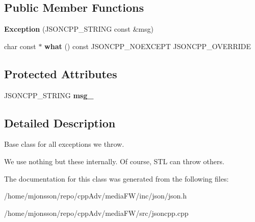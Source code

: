 \subsection*{Public Member Functions}
\begin{DoxyCompactItemize}
\item 
\mbox{\label{classJson_1_1Exception_ae764aa42e0755bd4ce9d303e2733fa8f}} 
{\bfseries Exception} (J\+S\+O\+N\+C\+P\+P\+\_\+\+S\+T\+R\+I\+NG const \&msg)
\item 
\mbox{\label{classJson_1_1Exception_a70b7ce35e761fb93e8cd338e04619cd6}} 
char const  $\ast$ {\bfseries what} () const J\+S\+O\+N\+C\+P\+P\+\_\+\+N\+O\+E\+X\+C\+E\+PT J\+S\+O\+N\+C\+P\+P\+\_\+\+O\+V\+E\+R\+R\+I\+DE
\end{DoxyCompactItemize}
\subsection*{Protected Attributes}
\begin{DoxyCompactItemize}
\item 
\mbox{\label{classJson_1_1Exception_aae3cbb8b45bf21480f64502a8329659f}} 
J\+S\+O\+N\+C\+P\+P\+\_\+\+S\+T\+R\+I\+NG {\bfseries msg\+\_\+}
\end{DoxyCompactItemize}


\subsection{Detailed Description}
Base class for all exceptions we throw.

We use nothing but these internally. Of course, S\+TL can throw others. 

The documentation for this class was generated from the following files\+:\begin{DoxyCompactItemize}
\item 
/home/mjonsson/repo/cpp\+Adv/media\+F\+W/inc/json/json.\+h\item 
/home/mjonsson/repo/cpp\+Adv/media\+F\+W/src/jsoncpp.\+cpp\end{DoxyCompactItemize}
